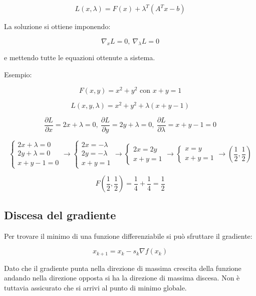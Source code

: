 \documentclass{article}
\begin{document}
\[
L(x,\lambda)
=
F(x)+\lambda^T(A^Tx-b)
\]

\vspace{5pt}

La soluzione si ottiene imponendo:

\[
\nabla_x L = 0,
\
\nabla_\lambda L = 0
\]

\vspace{5pt}

e mettendo tutte le equazioni ottenute a sistema.\newline

Esempio:

\[
F(x,y)=x^2+y^2\text{ con }x+y=1
\]

\[
L(x,y,\lambda)=x^2+y^2+\lambda(x+y-1)
\]

\[
\frac{\partial L}{\partial x}=2x+\lambda=0,\
\frac{\partial L}{\partial y}=2y+\lambda=0,\
\frac{\partial L}{\partial \lambda}=x+y-1=0
\]

\[
\begin{cases}
    2x+\lambda=0\\
    2y+\lambda=0\\
    x+y-1=0
\end{cases}
\rightarrow
\begin{cases}
    2x=-\lambda\\
    2y=-\lambda\\
    x+y=1
\end{cases}
\rightarrow
\begin{cases}
    2x=2y\\
    x+y=1
\end{cases}
\rightarrow
\begin{cases}
    x=y\\
    x+y=1
\end{cases}
\rightarrow
\left(\frac{1}{2},\frac{1}{2}\right)
\]

\[
F\left(\frac12,\frac12\right)
=
\frac14+\frac14
=
\frac12
\]\newpage

\subsection{Discesa del gradiente}

Per trovare il minimo di una funzione differenziabile si può sfruttare il gradiente:

\[
x_{k+1}=x_k-s_k\nabla f(x_k)
\]

\vspace{5pt}

Dato che il gradiente punta nella direzione di massima crescita della funzione andando nella direzione opposta si ha la direzione di massima discesa. Non è tuttavia assicurato che si arrivi al punto di minimo globale.\newline
\end{document}
